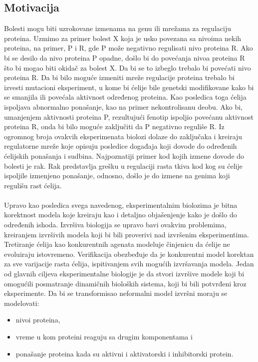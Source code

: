 \documentclass[a4paper]{article}
\begin{document}
\subsection{Motivacija}
Bolesti mogu biti uzrokovane izmenama na genu ili mrežama za regulaciju proteina. Uzmimo za primer bolest X koja je usko povezana sa nivoima nekih proteina, na primer, P i R, gde P može negativno regulisati nivo proteina R. Ako bi se desilo da nivo proteina P opadne, došlo bi do povećanja nivoa proteina R što bi mogao biti okidač za bolest X. Da bi se to izbeglo trebalo bi povećati nivo proteina R. Da bi bilo moguće izmeniti mreže regulacije proteina trebalo bi izvesti mutacioni eksperiment, u kome bi ćelije bile genetski modifikovane kako bi se smanjila ili povećala aktivnost određenog proteina. Kao posledica toga ćelija ispoljava abnormalno ponašanje, kao na primer nekontrolisanu deobu. Ako bi, umanjenjem aktivnosti proteina P, rezultujući fenotip ispoljio povećanu aktivnost proteina R, onda bi bilo moguće zaključiti da P negativno reguliše R. Iz ogromnog broja ovakvih eksperimenata biolozi dolaze do zaključaka i kreiraju regulatorne mreže koje opisuju posledice događaja koji dovode do određenih ćelijskih ponašanja i sudbina. Najpoznatiji primer kod kojih izmene dovode do bolesti je rak. Rak predstavlja grešku u regulaciji rasta tkiva kod kog su ćelije ispoljile izmenjeno ponašanje, odnosno, došlo je do izmene na genima koji regulišu rast ćelija.\\\\

Upravo kao posledica svega navedenog, eksperimentalnim biolozima je bitna korektnost modela koje kreiraju kao i detaljno objašenjenje kako je došlo do određenih ishoda. Izvršiva biologija se upravo bavi ovakvim problemima, kreiranjem izvršivih modela koji bi bili proverivi nad izvršenim eksperimentima. Tretiranje ćelija kao konkurentnih agenata modeluje činjenicu da ćelije ne evoluiraju istovremeno. Verifikacija obezbeđuje da je konkurentni model korektan za sve varijacije rasta ćelija, ispitivanjem svih mogućih izvršavanja modela.
Jedan od glavnih ciljeva eksperimentalne biologije je da stvori izvršive modele koji bi omogućili posmatranje dinamičnih bioloških sistema, koji bi bili potvrđeni kroz eksperimente. Da bi se transformisao neformalni model  izvršni moraju se modelovati:
\begin{itemize}
\item nivoi proteina,
\item vreme u kom proteini reaguju sa drugim komponentama i
\item ponašanje proteina kada su aktivni i aktivatorski i inhibitorski protein.
\end{itemize}
\end{document}
